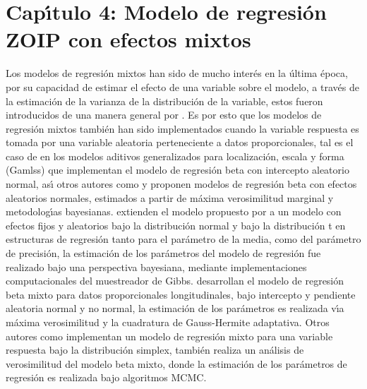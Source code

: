 \chapter{Cap\'{\i}tulo 4: Modelo de regresi\'{o}n ZOIP con efectos mixtos}\label{cap4}

Los modelos de regresi\'{o}n mixtos han sido de mucho inter\'{e}s en la \'{u}ltima \'{e}poca, por su capacidad de estimar el efecto de una variable sobre el modelo, a trav\'{e}s de la estimaci\'{o}n de la varianza de la distribuci\'{o}n de la variable, estos fueron introducidos de una manera general por \cite{Laird1}. Es por esto que los modelos de regresi\'{o}n mixtos tambi\'{e}n han sido implementados cuando la variable respuesta es tomada por una variable aleatoria perteneciente a datos proporcionales, tal es el caso de \cite{Stasinopoulos2} en los modelos aditivos generalizados para localizaci\'{o}n, escala y forma (Gamlss) que implementan el modelo de regresi\'{o}n beta con intercepto aleatorio normal, as\'{\i} otros autores como \cite{Verkuilen1} y \cite{Bonat1} proponen modelos de regresi\'{o}n beta con efectos aleatorios normales, estimados a partir de m\'{a}xima verosimilitud marginal y metodolog\'{\i}as bayesianas. \cite{Figueroa1} extienden el modelo propuesto por \cite{Ferrari2} a un modelo con efectos fijos y aleatorios bajo la distribuci\'{o}n normal y bajo la distribuci\'{o}n t en estructuras de regresi\'{o}n tanto para el par\'{a}metro de la media, como del par\'{a}metro de precisi\'{o}n, la estimaci\'{o}n de los par\'{a}metros del modelo de regresi\'{o}n fue realizado bajo una perspectiva bayesiana, mediante implementaciones computacionales del muestreador de Gibbs. \cite{Usuga1} desarrollan el modelo de regresi\'{o}n beta mixto para datos proporcionales longitudinales, bajo intercepto y pendiente aleatoria normal y no normal, la estimaci\'{o}n de los par\'{a}metros es realizada v\'{\i}a m\'{a}xima verosimilitud y la cuadratura de Gauss-Hermite adaptativa. Otros autores como \cite{Song1} implementan un modelo de regresi\'{o}n mixto para una variable respuesta bajo la distribuci\'{o}n simplex, \cite{Bonat2} tambi\'{e}n realiza un an\'{a}lisis de verosimilitud del modelo beta mixto, donde la estimaci\'{o}n de los par\'{a}metros de regresi\'{o}n es realizada bajo algoritmos MCMC.\\

